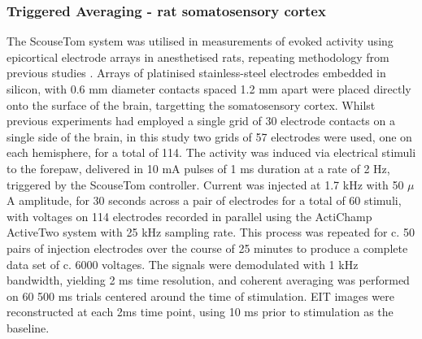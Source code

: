 \subsubsection{Triggered Averaging - rat somatosensory cortex}
\label{MTrig}
The ScouseTom system was utilised in measurements of evoked activity using epicortical electrode arrays in anesthetised rats, repeating methodology from previous studies \cite{Aristovich_2016} \cite{Vongerichten_2016}. Arrays of platinised stainless-steel electrodes embedded in silicon, with 0.6 mm diameter contacts spaced 1.2 mm apart were placed directly onto the surface of the brain, targetting the somatosensory cortex. Whilst previous experiments had employed a single grid of 30 electrode contacts on a single side of the brain, in this study two grids of 57 electrodes were used, one on each hemisphere, for a total of 114. The activity was induced via electrical stimuli to the forepaw, delivered in 10 mA pulses of 1 ms duration at a rate of 2 Hz, triggered by the ScouseTom controller. Current was injected at 1.7 kHz with 50 $\mu$A amplitude, for 30 seconds across a pair of electrodes for a total of 60 stimuli, with voltages on 114 electrodes recorded in parallel using the ActiChamp ActiveTwo system with 25 kHz sampling rate. This process was repeated for c. 50 pairs of injection electrodes over the course of 25 minutes to produce a complete data set of c. 6000 voltages. The signals were demodulated with 1 kHz bandwidth, yielding 2 ms time resolution, and coherent averaging was performed on 60 500 ms trials centered around the time of stimulation. EIT images were reconstructed at each 2ms time point, using 10 ms prior to stimulation as the baseline. 
